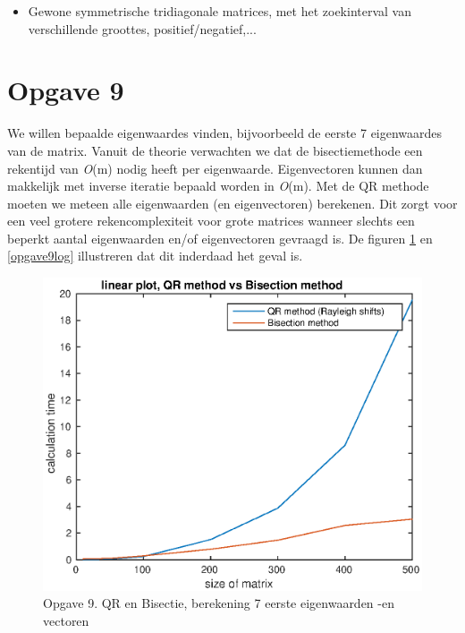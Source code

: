 \documentclass[]{article}
\newcommand{\opgave}[1]{\pagebreak\section*{Opgave #1}}
\begin{document}
\begin{itemize}
	\item Gewone symmetrische tridiagonale matrices, met het zoekinterval van verschillende groottes, positief/negatief,...
\end{itemize}

\opgave{9}
We willen bepaalde eigenwaardes vinden, bijvoorbeeld de eerste 7 eigenwaardes van de matrix. Vanuit de theorie verwachten we dat de bisectiemethode een rekentijd van \textit{O}(m) nodig heeft per eigenwaarde. Eigenvectoren kunnen dan makkelijk met inverse iteratie bepaald worden in \textit{O}(m). \linebreak
Met de QR methode moeten we meteen alle eigenwaarden (en eigenvectoren) berekenen. Dit zorgt voor een veel grotere rekencomplexiteit voor grote matrices wanneer slechts een beperkt aantal eigenwaarden en/of eigenvectoren gevraagd is.
De figuren \ref{opgave9lin} en \ref{opgave9log} illustreren dat dit inderdaad het geval is.

\begin{figure}
\begin{center}
\includegraphics[width=1\textwidth]{opgave9lin.eps}
\end{center}
\caption{Opgave 9. QR en Bisectie, berekening 7 eerste eigenwaarden -en vectoren}
\label{opgave9lin}
\end{figure}
\end{document}

